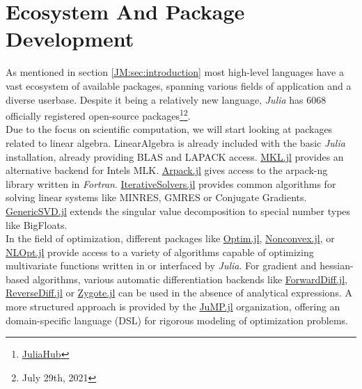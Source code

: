 \section{Ecosystem And Package Development}
\label{JM:sec:ECO}

As mentioned in section \ref{JM:sec:introduction} most high-level languages have a vast ecosystem of available packages, spanning various fields of application and 
a diverse userbase. Despite it being a relatively new language, \textit{Julia} has 6068 officially registered open-source packages\footnote{\href{https://juliahub.com/ui/Packages}{JuliaHub}}\footnote{July 29th, 2021}.\\

Due to the focus on scientific computation, we will start looking at packages related to linear algebra. LinearAlgebra is already included with the basic \textit{Julia} installation, already providing BLAS and LAPACK access. \href{https://github.com/JuliaLinearAlgebra/MKL.jl.git}{MKL.jl}
provides an alternative backend for Intels MLK. \href{https://github.com/JuliaLinearAlgebra/Arpack.jl.git}{Arpack.jl} gives access to the arpack-ng library written in \textit{Fortran}. 
\href{https://github.com/JuliaLinearAlgebra/IterativeSolvers.jl.git}{IterativeSolvers.jl} provides common algorithms for solving linear systems like MINRES, GMRES or Conjugate Gradients. \href{https://github.com/JuliaLinearAlgebra/GenericSVD.jl.git}{GenericSVD.jl} extends the singular value decomposition to
special number types like BigFloats.\\

In the field of optimization, different packages like \href{https://github.com/JuliaNLSolvers/Optim.jl.git}{Optim.jl}, \href{https://github.com/mohamed82008/Nonconvex.jl.git}{Nonconvex.jl}, or \href{https://github.com/JuliaOpt/NLopt.jl.git}{NLOpt.jl} provide access to a variety of algorithms capable of optimizing multivariate functions written in or interfaced by \textit{Julia}.
For gradient and hessian-based algorithms, various automatic differentiation backends like \href{https://github.com/JuliaDiff/ForwardDiff.jl.git}{ForwardDiff.jl}, \href{https://github.com/JuliaDiff/ReverseDiff.jl.git}{ReverseDiff.jl} or \href{https://github.com/FluxML/Zygote.jl.git}{Zygote.jl} can be used in the absence of analytical expressions.
A more structured approach is provided by the \href{https://github.com/jump-dev/JuMP.jl.git}{JuMP.jl} organization, offering an domain-specific language (DSL) for rigorous modeling of optimization problems.\\

